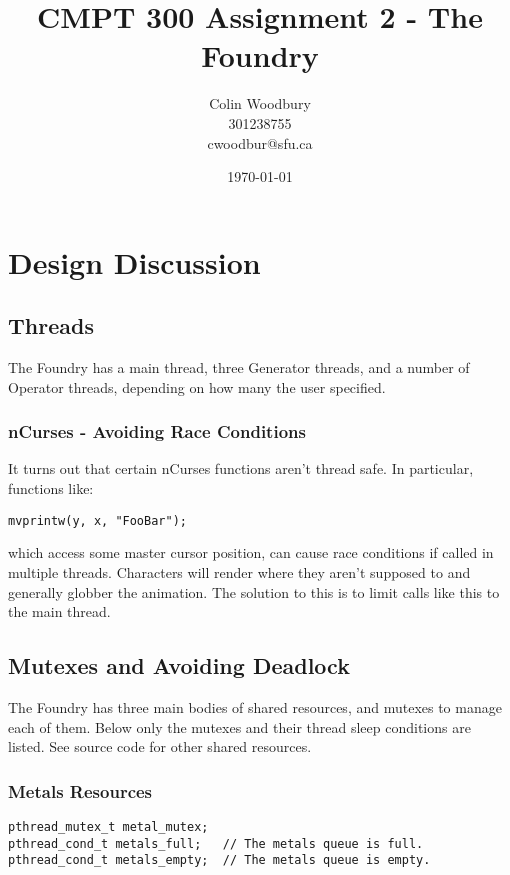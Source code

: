 \documentclass[titlepage]{article}
\begin{document}
\title{CMPT 300 Assignment 2 - The Foundry}
\author{Colin Woodbury\\ 301238755\\ cwoodbur@sfu.ca}
\date{\today}
\maketitle

\section{Design Discussion}

\subsection{Threads}
The Foundry has a main thread, three Generator threads, and a number of
Operator threads, depending on how many the user specified.

\subsubsection{nCurses - Avoiding Race Conditions}
It turns out that certain nCurses functions aren't thread safe.
In particular, functions like:

\begin{lstlisting}
mvprintw(y, x, "FooBar");
\end{lstlisting}

which access some master cursor position, can cause race conditions
if called in multiple threads. Characters will render where they aren't
supposed to and generally globber the animation. The solution to this
is to limit calls like this to the main thread.

\subsection{Mutexes and Avoiding Deadlock}
The Foundry has three main bodies of shared resources, and mutexes to manage
each of them. Below only the mutexes and their thread sleep conditions are
listed. See source code for other shared resources.

\subsubsection{Metals Resources}
\begin{lstlisting}
pthread_mutex_t metal_mutex;
pthread_cond_t metals_full;   // The metals queue is full.
pthread_cond_t metals_empty;  // The metals queue is empty.
\end{lstlisting}
\end{document}
